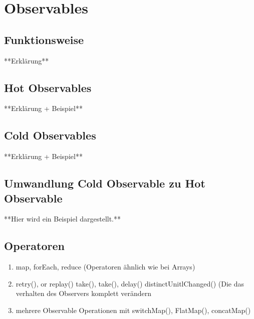 \section{Observables}

\subsection{Funktionsweise}
**Erklärung**

\subsection{Hot Observables}
**Erklärung + Beispiel**

\subsection{Cold Observables}
**Erklärung + Beispiel**

\subsection{Umwandlung Cold Observable zu Hot Observable}
**Hier wird ein Beispiel dargestellt.**

\subsection{Operatoren}
\begin{enumerate} 
\item map, forEach, reduce (Operatoren ähnlich wie bei Arrays)
\item retry(), or replay() take(), take(), delay() distinctUnitlChanged() (Die das verhalten des Observers komplett verändern
\item mehrere Observable Operationen mit switchMap(), FlatMap(), concatMap()
\end{enumerate}

